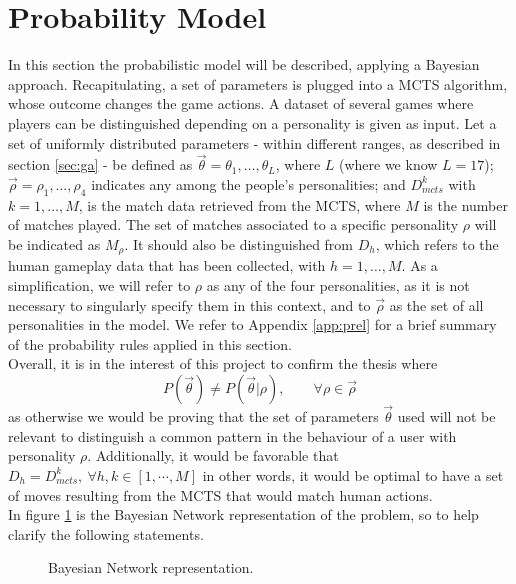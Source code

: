 \section{Probability Model}\label{sec:mlmethod}
In this section the probabilistic model will be described, applying a Bayesian approach. Recapitulating, a set of parameters is plugged into a MCTS algorithm, whose outcome changes the game actions. A dataset of several games where players can be distinguished depending on a personality is given as input. Let a set of uniformly distributed parameters - within different ranges, as described in section \ref{sec:ga} - be defined as $\vec{\theta} = {\theta_1,\ldots,\theta_L}$, where $L$ (where we know $L=17$); $\vec{\rho} = {\rho_1,\ldots,\rho_4}$ indicates any among the people's personalities; and $D_{mcts}^k$ with $k=1,\ldots,M$, is the match data retrieved from the MCTS, where $M$ is the number of matches played. The set of matches associated to a specific personality $\rho$ will be indicated as $M_\rho$. It should also be distinguished from $D_h$, which refers to the human gameplay data that has been collected, with $h=1,\ldots,M$. As a simplification, we will refer to $\rho$ as any of the four personalities, as it is not necessary to singularly specify them in this context, and to $\vec{\rho}$ as the set of all personalities in the model. We refer to Appendix \ref{app:prel} for a brief summary of the probability rules applied in this section.\\
Overall, it is in the interest of this project to confirm the thesis where \begin{equation}\label{eq:thesis}
P(\vec{\theta}) \neq P(\vec{\theta}|\rho), \qquad \forall \rho \in \vec{\rho}
\end{equation} as otherwise we would be proving that the set of parameters $\vec{\theta}$ used will not be relevant to distinguish a common pattern in the behaviour of a user with personality $\rho$. Additionally, it would be favorable that $D_h=D_{mcts}^k,\  \forall h,k \in [1,\cdots,M]$ in other words, it would be optimal to have a set of moves resulting from the MCTS that would match human actions.\\
In figure \ref{fig:BN} is the Bayesian Network representation of the problem, so to help clarify the following statements.
\begin{figure}[H]
\centering
{}
\caption{Bayesian Network representation.}\label{fig:BN}
\end{figure}

